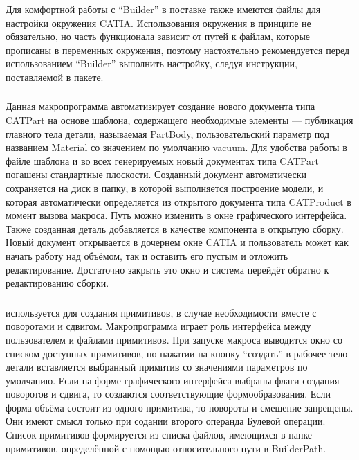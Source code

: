 Для комфортной работы с ``Builder'' в поставке также имеются файлы для настройки окружения CATIA. Использования окружения в принципе не обязательно, но часть функционала зависит от путей к файлам, которые прописаны в переменных окружения, поэтому настоятельно рекомендуется перед использованием ``Builder'' выполнить настройку, следуя инструкции, поставляемой в пакете.

\subsubsection{}\label{sec:AddNewPart}

Данная макропрограмма автоматизирует создание нового документа типа CATPart на основе шаблона, содержащего необходимые элементы --- публикация главного тела детали, называемая PartBody, пользовательский параметр под названием Material со значением по умолчанию vacuum. Для удобства работы в файле шаблона и во всех генерируемых новый документах типа CATPart погашены стандартные плоскости. Созданный документ автоматически сохраняется на диск в папку, в которой выполняется построение модели, и которая автоматически определяется из открытого документа типа CATProduct в момент вызова макроса. Путь можно изменить в окне графического интерфейса. Также созданная деталь добавляется в качестве компонента в открытую сборку. Новый документ открывается в дочернем окне CATIA и пользователь может как начать работу над объёмом, так и оставить его пустым и отложить редактирование. Достаточно закрыть это окно и система перейдёт обратно к редактированию сборки.

\subsubsection{}\label{sec:AddShape}

 используется для создания примитивов, в случае необходимости вместе с поворотами и сдвигом. Макропрограмма играет роль интерфейса между пользователем и файлами примитивов. При запуске макроса выводится окно со списком доступных примитивов, по нажатии на кнопку ``создать'' в рабочее тело детали вставляется выбранный примитив со значениями параметров по умолчанию. Если на форме графического интерфейса выбраны флаги создания поворотов и сдвига, то создаются соответствующие формообразования. Если форма объёма состоит из одного примитива, то повороты и смещение запрещены. Они имеют смысл только при содании второго операнда Булевой операции. Список примитивов формируется из списка файлов, имеющихся в папке примитивов, определённой с помощью относительного пути в BuilderPath.


